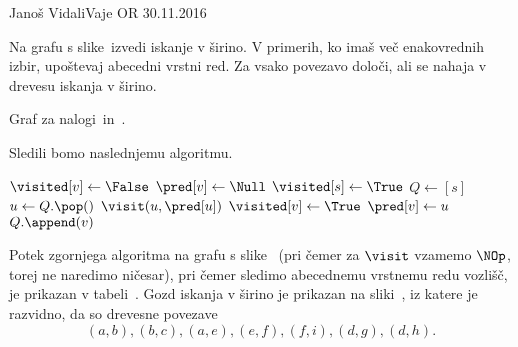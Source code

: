 
\begin{naloga}{Janoš Vidali}{Vaje OR 30.11.2016}
\begin{vprasanje}
Na grafu s slike~\fig izvedi iskanje v širino.
V primerih, ko imaš več ena\-ko\-vred\-nih izbir,
upoštevaj abecedni vrstni red.
Za vsako povezavo določi, ali se nahaja v drevesu iskanja v širino.

\begin{slika}
\pgfslika
\caption{Graf za nalogi~\nal in~\nal[dfs].}
\end{slika}
\end{vprasanje}

\begin{odgovor}
Sledili bomo naslednjemu algoritmu.
\begin{small}
\begin{algorithmic}
		\State $\visited[v] \gets \False$
        \State $\pred[v] \gets \Null$
	\EndFor
		\If{$\lnot \visited[s]$}
			\State $\visited[s] \gets \True$
			\State $Q \gets [s]$
				\State $u \gets Q.\pop()$
                \State $\visit(u, \pred[u])$
					\If{$\lnot \visited[v]$}
						\State $\visited[v] \gets \True$
						\State $\pred[v] \gets u$
						\State $Q.\append(v)$
					\EndIf
				\EndFor
			\EndWhile
		\EndIf
	\EndFor
\EndFunction
\end{algorithmic}
\end{small}
%
Potek zgornjega algoritma na grafu s slike~\fig
(pri čemer za $\visit$ vzamemo $\NOp$, torej ne naredimo ničesar),
pri čemer sledimo abecednemu vrstnemu redu vozlišč,
je prikazan v tabeli~\tab.
Gozd iskanja v širino je prikazan na sliki~,
iz katere je razvidno, da so drevesne povezave
$$
(a, b), (b, c), (a, e), (e, f), (f, i), (d, g), (d, h).
$$


\end{odgovor}
\end{naloga}
